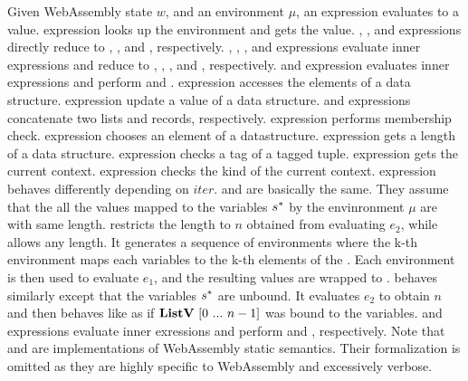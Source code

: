 Given WebAssembly state $w$, and an environment $\mu$, an expression evaluates
to a value.
\vare{} expression looks up the environment and gets the value.
\nume{}, \boole{}, and \fnamee{} expressions directly reduce to \numv{},
\boolv{}, and \fnamev{}, respectively.
\liste{}, \stre{}, \tupe{}, and \casee{} expressions evaluate inner expressions
and reduce to \listv{}, \strv{}, \tupv{}, and \casev{}, respectively.
\une{} and \bine{} expression evaluates inner expressions and perform \unop{}
and \binop{}.
\acce{} expression accesses the elements of a data structure.
\upde{} expression update a value of a data structure.
\cate{} and \compe{} expressions concatenate two lists and records,
respectively.
\meme{} expression performs membership check.
\choosee{} expression chooses an element of a datastructure.
\lene{} expression gets a length of a data structure.
\iscaseofe{} expression checks a tag of a tagged tuple.
\getcurctxe{} expression gets the current context.
\ctxkinde{} expression checks the kind of the current context.
\itere{} expression behaves differently depending on $iter$.
\listiter{} and \listniter{} are basically the same.
They assume that the all the values mapped to the variables $s^*$ by the
envinronment $\mu${} are \listv{} with same length.
\listniter{} restricts the length to $n$ obtained from evaluating $e_2$,
while \listiter{} allows any length.
It generates a sequence of environments where the k-th environment maps each
variables to the k-th elements of the \listv{}.
Each environment is then used to evaluate $e_1$, and the resulting values are
wrapped to \listv{}.
\listidxiter{} behaves similarly except that the variables $s^*$ are
unbound.
It evaluates $e_2$ to obtain $n$ and then behaves like \listniter{} as if
$\textbf{ListV} ~ [0 ~ ... ~ n-1]$ was bound to the variables.
\matche{} and \hastypee{} expressions evaluate inner exressions and perform
\match{} and \hastype{}, respectively.
Note that \match{} and \hastype{} are implementations of WebAssembly static
semantics.
Their formalization is omitted as they are highly specific to WebAssembly and
excessively verbose.





